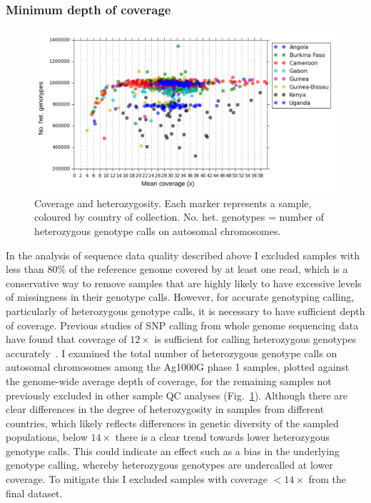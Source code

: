 \documentclass[a4paper,11pt,abstracton,hidelinks]{scrartcl}
\begin{document}
\subsubsection{Minimum depth of coverage}


\begin{figure}[t!]
\centering
\includegraphics[width=\textwidth]{artwork/chapter3/coverage_hetz.pdf}
\caption{Coverage and heterozygosity.
%
Each marker represents a sample, coloured by country of collection.
%
No. het. genotypes = number of heterozygous genotype calls on autosomal chromosomes.
%
}
%
\label{fig:coverage_hetz}
\end{figure}


In the analysis of sequence data quality described above I excluded samples with less than 80\% of the reference genome covered by at least one read, which is a conservative way to remove samples that are highly likely to have excessive levels of missingness in their genotype calls.
%
However, for accurate genotyping calling, particularly of heterozygous genotype calls, it is necessary to have sufficient depth of coverage.
%
Previous studies of SNP calling from whole genome sequencing data have found that coverage of $12\times$ is sufficient for calling heterozygous genotypes accurately~\parencite{Meynert2014}.
%
I examined the total number of heterozygous genotype calls on autosomal chromosomes among the Ag1000G phase 1 samples, plotted against the genome-wide average depth of coverage, for the remaining samples not previously excluded in other sample QC analyses (Fig.~\ref{fig:coverage_hetz}).
%
Although there are clear differences in the degree of heterozygosity in samples from different countries, which likely reflects differences in genetic diversity of the sampled populations, below $14\times$ there is a clear trend towards lower heterozygous genotype calls.
%
This could indicate an effect such as a bias in the underlying genotype calling, whereby heterozygous genotypes are undercalled at lower coverage.
%
To mitigate this I excluded samples with coverage $<14\times$ from the final dataset.
\end{document}

